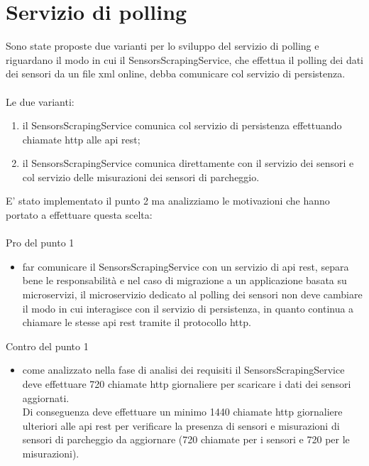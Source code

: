 \section{Servizio di polling}
Sono state proposte due varianti per lo sviluppo del servizio di polling e riguardano il
modo in cui il SensorsScrapingService, che effettua il polling dei dati dei sensori
da un file \gls{xml} online, debba comunicare col servizio di persistenza.
\\\\
Le due varianti:
\begin{enumerate}
    \item il SensorsScrapingService comunica col servizio di persistenza effettuando chiamate \gls{http} 
        alle \gls{api} \gls{rest};
    \item il SensorsScrapingService comunica direttamente con il servizio dei sensori e col servizio delle misurazioni 
        dei sensori di parcheggio.
\end{enumerate}
\leavevmode\newline
E' stato implementato il punto 2 ma analizziamo le motivazioni che hanno portato a effettuare questa scelta:
\\\\
Pro del punto 1
\begin{itemize}
    \item far comunicare il SensorsScrapingService con un servizio di \gls{api} \gls{rest}, separa bene le responsabilità e 
        nel caso di migrazione a un applicazione basata su microservizi, il microservizio dedicato al polling dei sensori 
        non deve cambiare il modo in cui interagisce
        con il servizio di persistenza, in quanto continua a chiamare le stesse \gls{api} \gls{rest} tramite il protocollo \gls{http}.
\end{itemize}
\leavevmode\newline
Contro del punto 1
\begin{itemize}
    \item come analizzato nella fase di analisi dei requisiti il SensorsScrapingService deve effettuare 720 chiamate \gls{http} giornaliere
        per scaricare i dati dei sensori aggiornati. 
        \\
        Di conseguenza deve effettuare un minimo 1440 chiamate \gls{http} giornaliere ulteriori alle \gls{api} \gls{rest} 
        per verificare la presenza di sensori e misurazioni di sensori di parcheggio 
        da aggiornare (720 chiamate per i sensori e 720 per le misurazioni).
\end{itemize}

